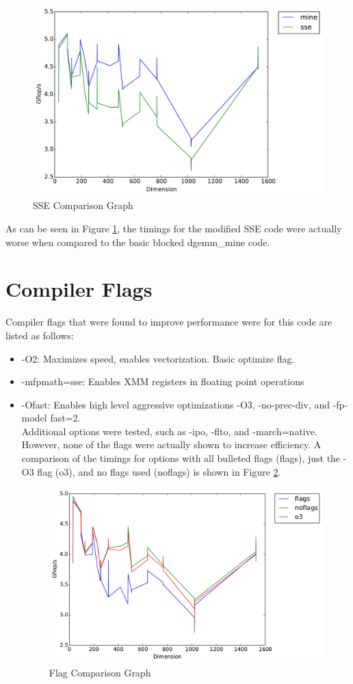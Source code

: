 \documentclass[letterpaper]{article}	 %
\begin{document}
\begin{figure}[H]
  \centering
  \includegraphics[width=.6\linewidth]{timing_sse.pdf}
  \caption{SSE Comparison Graph}
  \label{fig:sse}
\end{figure}
  
  As can be seen in Figure \ref{fig:sse}, the timings for the modified SSE code were actually worse when compared to the basic blocked dgemm\_mine code. 


\section{Compiler Flags}
Compiler flags that were found to improve performance were for this code are listed as follows: \\
\begin{itemize}
\item -O2: Maximizes speed, enables vectorization. Basic optimize flag. 
\item -mfpmath=sse: Enables XMM registers in floating point operations
\item -Ofast: Enables high level aggressive optimizations -O3, -no-prec-div, and -fp-model fast=2. 
\\ 

Additional options were tested, such as -ipo, -flto, and -march=native. However, none of the flags were actually shown to increase efficiency. A comparison of the timings for options with all bulleted flags (flags), just the -O3 flag (o3), and no flags used (noflags) is shown in Figure \ref{fig:flags}. 

\begin{figure}[H]
\centering
  \centering
  \includegraphics[width=.6\linewidth]{timing_flagcompare.pdf}
  \caption{Flag Comparison Graph}
  \label{fig:flags}
  \end{figure}

\end{itemize}
\end{document}

